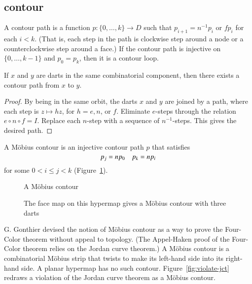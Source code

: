 \subsection{contour}

\begin{definition}  A contour path is a function $p:\{0,\ldots,k\}\to D$
such that $p_{i+1} =
n^{-1} p_i$ or $f p_i$ for each $i<k$.  (That is, each
step in the path is clockwise step around a node or a
counterclockwise step around a face.)   If the contour path
is injective on $\{0,\ldots,k-1\}$
and  $p_0 = p_k$, then it is a contour loop.
\end{definition}

\begin{lemma}  
If $x$ and $y$ are darts in the same combinatorial component, then there exists a contour path from $x$ to $y$.
\end{lemma}

\begin{proof} 
By being in the same orbit, the darts $x$ and $y$ are joined by a path, where each step is $z\mapsto h z$, for $h=e,n$, or $f$.  Eliminate $e$-steps through the relation $e\circ n\circ f = I$.   Replace each $n$-step with a sequence of $n^{-1}$-steps.  This gives the desired path.
\end{proof}

\begin{definition} A M\"obius contour is an
injective contour path $p$ that satisfies
    \begin{equation}
    \tlabel{eqn:mobius}
    p_j = n p_0\quad p_k = n p_i
    \end{equation}
for some $0 < i\le j< k$ (Figure~\ref{fig:mobius}).
\end{definition}

\begin{figure}[htb]
  \centering
  \caption{A M\"obius contour}
  \label{fig:mobius}
\end{figure}

\begin{figure}[htb]
  \centering
  \caption{The face map on this hypermap gives a M\"obius contour with three darts}
  \label{fig:3m}
\end{figure}


\begin{remark}
G. Gonthier devised the notion of M\"obius contour
as a way to prove the Four-Color theorem without appeal
to topology.  (The Appel-Haken
proof of the Four-Color theorem relies on the Jordan
curve theorem.)  A M\"obius contour is a 
combinatorial M\"obius strip that
twists to make 
its left-hand side into
its right-hand side.  A planar hypermap has no such contour.  
Figure~\ref{fig:violate-jct}
redraws a violation of the Jordan curve theorem
as a M\"obius contour.   
\end{remark}

